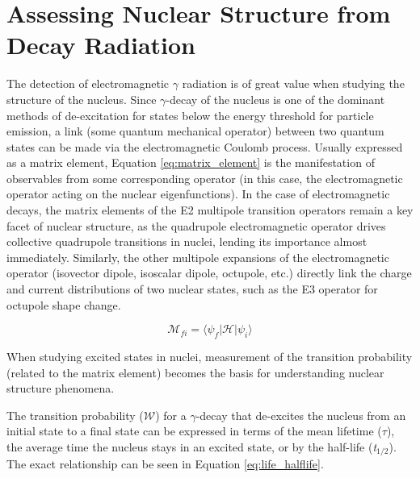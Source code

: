 \section{Assessing Nuclear Structure from Decay Radiation}
The detection of electromagnetic $\gamma$ radiation is of great value when studying the structure of the nucleus. Since $\gamma$-decay of the nucleus is one of the dominant methods of de-excitation for states below the energy threshold for particle emission, a link (some quantum mechanical operator) between two quantum states can be made via the electromagnetic Coulomb process. Usually expressed as a matrix element, Equation \ref{eq:matrix_element} is the manifestation of observables from some corresponding operator (in this case, the electromagnetic operator acting on the nuclear eigenfunctions). In the case of electromagnetic decays, the matrix elements of the E2 multipole transition operators remain a key facet of nuclear structure, as the quadrupole electromagnetic operator drives collective quadrupole transitions in nuclei, lending its importance almost immediately. Similarly, the other multipole expansions of the electromagnetic operator (isovector dipole, isoscalar dipole, octupole, etc.) directly link the charge and current distributions of two nuclear states, such as the E3 operator for octupole shape change.

\begin{equation}\label{eq:matrix_element}
\mathcal{M}_{fi}=\langle\psi_f\vert\mathcal{H}\vert\psi_i\rangle
\end{equation}

When studying excited states in nuclei, measurement of the transition probability (related to the matrix element) becomes the basis for understanding nuclear structure phenomena. 

\label{sec:why_lifetimes}
The transition probability ($\mathcal{W}$) for a $\gamma$-decay that de-excites the nucleus from an initial state to a final state can be expressed in terms of the mean lifetime ($\tau$), the average time the nucleus stays in an excited state, or by the half-life (\textit{t$_{1/2}$}). The exact relationship can be seen in Equation \ref{eq:life_halflife}.

